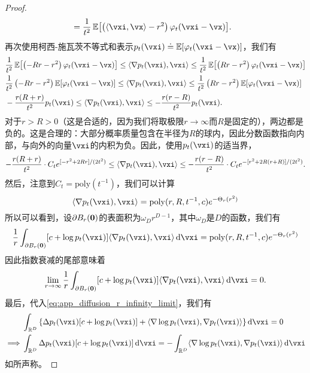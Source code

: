 \documentclass[../../book-main.tex]{subfiles}
\begin{document}
\begin{proof}
\begin{align}
        &= \frac{1}{t^{2}}\Ex\rs{\bp{\ip{\vxi}{\vx} - r^{2}}\phi_{t}(\vxi - \vx)}.
    \end{align}
    再次使用柯西-施瓦茨不等式和表示\(p_{t}(\vxi) \doteq \Ex[\phi_{t}(\vxi - \vx)]\)，我们有
    \begin{align}
        &\frac{1}{t^{2}}\Ex\rs{\bp{-Rr - r^{2}}\phi_{t}(\vxi - \vx)} \leq \ip{\nabla p_{t}(\vxi)}{\vxi} \leq \frac{1}{t^{2}}\Ex\rs{\bp{Rr - r^{2}}\phi_{t}(\vxi - \vx)} \\
        &\frac{1}{t^{2}}\bp{-Rr - r^{2}}\Ex\rs{\phi_{t}(\vxi - \vx)} \leq \ip{\nabla p_{t}(\vxi)}{\vxi} \leq \frac{1}{t^{2}}\bp{Rr - r^{2}}\Ex\rs{\phi_{t}(\vxi - \vx)} \\
        &-\frac{r(R + r)}{t^{2}}p_{t}(\vxi) \leq \ip{\nabla p_{t}(\vxi)}{\vxi} \leq -\frac{r(r - R)}{t^{2}}p_{t}(\vxi).
    \end{align}
    对于\(r > R > 0\)（这是合适的，因为我们将取极限\(r \to \infty\)而\(R\)是固定的），两边都是负的。这是合理的：大部分概率质量包含在半径为\(R\)的球内，因此分数函数指向内部，与向外的向量\(\vxi\)的内积为负。因此，使用\(p_{t}(\vxi)\)的适当界，
    \begin{equation}
        -\frac{r(R + r)}{t^{2}}\cdot C_{t}e^{[-r^{2} + 2Rr]/(2t^{2})} \leq \ip{\nabla p_{t}(\vxi)}{\vxi} \leq -\frac{r(r - R)}{t^{2}}\cdot C_{t}e^{-[r^{2} + 2R(r + R)]/(2t^{2})}.
    \end{equation}
    然后，注意到\(C_{t} = \mathrm{poly}(t^{-1})\)，我们可以计算
    \begin{equation}
        [c + \log p_{t}(\vxi)]\ip{\nabla p_{t}(\vxi)}{\vxi} = \mathrm{poly}(r, R, t^{-1}, c)e^{-\Theta_{r}(r^{2})}
    \end{equation}
    所以可以看到，设\(\partial B_{r}(\bm{0})\)的表面积为\(\omega_{D} r^{D - 1}\)，其中\(\omega_{D}\)是\(D\)的函数，我们有
    \begin{equation}
        \frac{1}{r}\int_{\partial B_{r}(\vzero)}[c + \log p_{t}(\vxi)]\ip{\nabla p_{t}(\vxi)}{\vxi}\odif{\vxi} = \mathrm{poly}(r, R, t^{-1}, c)e^{-\Theta_{r}(r^{2})}
    \end{equation}
    因此指数衰减的尾部意味着
    \begin{equation}
        \lim_{r \to \infty}\frac{1}{r}\int_{\partial B_{r}(\vzero)}[c + \log p_{t}(\vxi)]\ip{\nabla p_{t}(\vxi)}{\vxi}\odif{\vxi} = 0.
    \end{equation}
    最后，代入\eqref{eq:app_diffusion_r_infinity_limit}，我们有
    \begin{align}
        &\int_{\R^{D}}\bc{\Delta p_{t}(\vxi)[c + \log p_{t}(\vxi)] + \ip{\nabla \log p_{t}(\vxi)}{\nabla p_{t}(\vxi)}}\odif{\vxi} = 0 \\
        \implies 
        &\int_{\R^{D}}\Delta p_{t}(\vxi)[c + \log p_{t}(\vxi)]\odif{\vxi} = -\int_{\R^{D}}\ip{\nabla \log p_{t}(\vxi)}{\nabla p_{t}(\vxi)}\odif{\vxi}
    \end{align}
    如所声称。
\end{proof}
\end{document}
